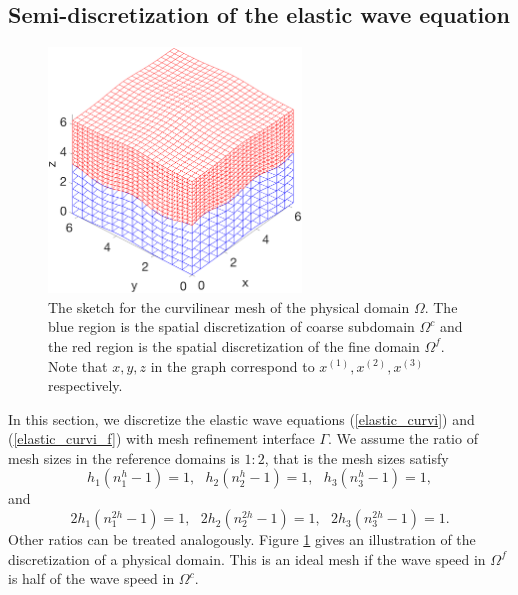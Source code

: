 \subsection{Semi-discretization of the elastic wave equation}\label{semi_discrete_form}

\begin{figure}[htbp]
	\centering
	\includegraphics[width=0.6\textwidth,trim={0.4cm 0.7cm 0.8cm 1.4cm}, clip]{physical_discretization.eps}
	\caption{The sketch for the curvilinear mesh of the physical domain $\Omega$. The blue region is the spatial discretization of coarse subdomain $\Omega^c$ and the red region is the spatial discretization of the fine domain $\Omega^f$. Note that $x,y,z$ in the graph correspond to $x^{(1)}, x^{(2)}, x^{(3)}$ respectively. 
	 }\label{physical_discretization}
\end{figure}

In this section, we discretize the elastic wave equations (\ref{elastic_curvi}) and  (\ref{elastic_curvi_f}) with mesh refinement interface $\Gamma$. We assume the ratio of mesh sizes in the reference domains is $1:2$, that is the mesh sizes satisfy
\[h_1(n_1^h-1) = 1, \ \ \ h_2(n_2^h-1) = 1, \ \ \ h_3(n_3^h-1) = 1,\]
and
\[2h_1(n_1^{2h}-1) = 1, \ \ \ 2h_2(n_2^{2h}-1) = 1, \ \ \ 2h_3(n_3^{2h}-1) = 1.\]
 Other ratios can be treated analogously. Figure \ref{physical_discretization} gives an illustration of the discretization of a physical domain. This is an ideal mesh if the wave speed in $\Omega^f$ is half of the wave speed in $\Omega^c$.

